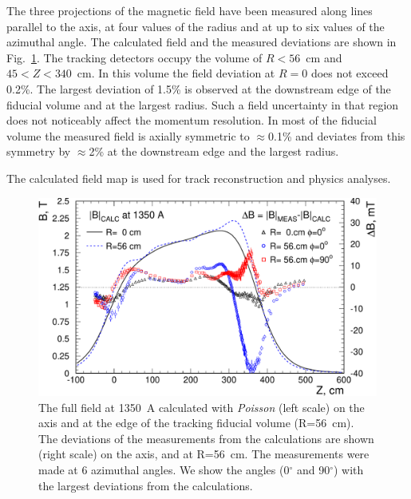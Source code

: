 The three projections of the magnetic field have been measured along lines
parallel to the axis, at four values of the radius and at up to six values
of the azimuthal angle. The calculated field and the measured deviations are shown in Fig.~\ref{fig:sol:field_comparison}. The
tracking detectors occupy the volume of $R<56$~cm and $45<Z<340$~cm. In
this volume the field deviation at $R=0$ does not exceed 0.2\%. The
largest deviation of 1.5\% is observed at the downstream edge of the
fiducial volume and at the largest radius. Such a field uncertainty in
that region does not noticeably affect the momentum resolution. In
most of the fiducial volume the measured field is axially symmetric to
$\approx$0.1\% and deviates from this symmetry by $\approx$2\% at the
downstream edge and the largest radius.

The calculated field map is used for track reconstruction and
physics analyses.
   

\begin{figure}[!htb]
  \begin{center}
     \includegraphics[angle=0,width=1.0\linewidth]{figures/solenoid_field_calc-meas_comparison_7_1_01}%
  \end{center}
  \caption{
    The full field at 1350~A calculated with {\it Poisson} (left
    scale) on the axis and at the edge of the tracking fiducial volume (R=56~cm). The deviations of the measurements from the
    calculations are shown (right scale) on the axis, and at R=56~cm. The measurements were made at 6 azimuthal
    angles. We show the angles (0$^\circ$ and 90$^\circ$) with the largest deviations from the
    calculations.
    \label{fig:sol:field_comparison}
  }
\end{figure}


